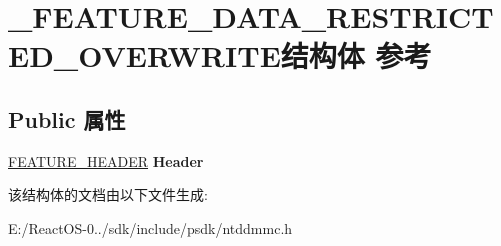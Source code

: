 \hypertarget{struct___f_e_a_t_u_r_e___d_a_t_a___r_e_s_t_r_i_c_t_e_d___o_v_e_r_w_r_i_t_e}{}\section{\+\_\+\+F\+E\+A\+T\+U\+R\+E\+\_\+\+D\+A\+T\+A\+\_\+\+R\+E\+S\+T\+R\+I\+C\+T\+E\+D\+\_\+\+O\+V\+E\+R\+W\+R\+I\+T\+E结构体 参考}
\label{struct___f_e_a_t_u_r_e___d_a_t_a___r_e_s_t_r_i_c_t_e_d___o_v_e_r_w_r_i_t_e}
\subsection*{Public 属性}
\begin{DoxyCompactItemize}
\item 
\mbox{\label{struct___f_e_a_t_u_r_e___d_a_t_a___r_e_s_t_r_i_c_t_e_d___o_v_e_r_w_r_i_t_e_ad3b54fa7beabb4261baee3d0d4c74722}} 
\hyperlink{struct___f_e_a_t_u_r_e___h_e_a_d_e_r}{F\+E\+A\+T\+U\+R\+E\+\_\+\+H\+E\+A\+D\+ER} {\bfseries Header}
\end{DoxyCompactItemize}


该结构体的文档由以下文件生成\+:\begin{DoxyCompactItemize}
\item 
E\+:/\+React\+O\+S-\/0../sdk/include/psdk/ntddmmc.\+h\end{DoxyCompactItemize}
